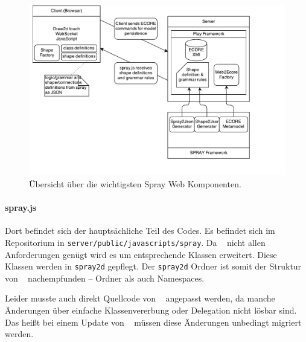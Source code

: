 \begin{figure}[h!]
  \centering
  \includegraphics[width=1.0\textwidth]{Figures/ComponentOverview.draw.io.pdf}
  \caption{Übersicht über die wichtigsten Spray Web Komponenten.}
  \label{fig.ComponentOverview}
\end{figure}

\paragraph{spray.js} Dort befindet sich der hauptsächliche Teil des Codes.
Es befindet sich im Repositorium in {\tt server/public/javascripts/spray}.
Da \dd~ nicht allen Anforderungen genügt wird es um entsprechende Klassen erweitert.
Diese \dd~ Klassen werden in {\tt spray2d} gepflegt.
Der {\tt spray2d} Ordner ist somit der Struktur von \dd~ nachempfunden -- Ordner
als auch Namespaces.

Leider musste auch direkt Quellcode von \dd~ angepasst werden, da manche Änderungen
über einfache Klassenvererbung oder Delegation nicht lösbar sind.
Das heißt bei einem Update von \dd~ müssen diese Änderungen unbedingt migriert werden.
